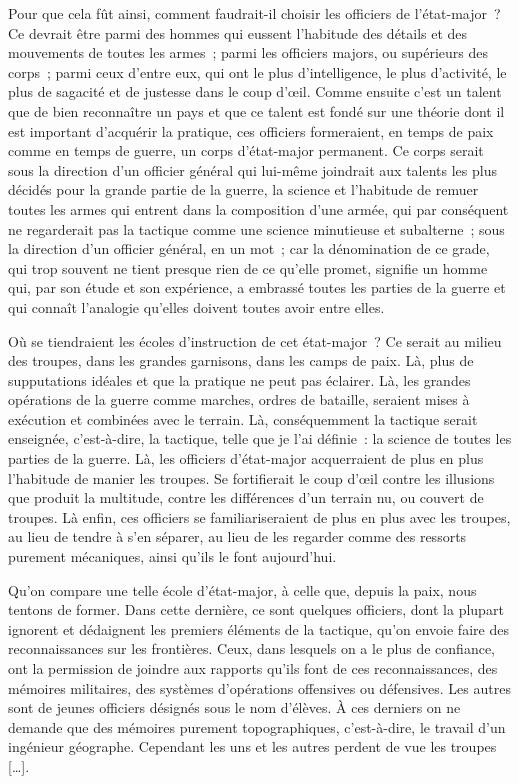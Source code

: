 \documentclass[french,twoside]{book} %
\begin{document}
Pour que cela fût ainsi, comment faudrait-il choisir les officiers de l’état-major ? Ce devrait être parmi des hommes qui eussent l’habitude des détails et des mouvements de toutes les armes ; parmi les officiers majors, ou supérieurs des corps ; parmi ceux d’entre eux, qui ont le plus d’intelligence, le plus d’activité, le plus de sagacité et de justesse dans le coup d’œil. Comme ensuite c’est un talent que de bien reconnaître un pays et que ce talent est fondé sur une théorie dont il est important d’acquérir la pratique, ces officiers formeraient, en temps de paix comme en temps de guerre, un corps d’état-major permanent. Ce corps serait sous la direction d’un officier général qui lui-même joindrait aux talents les plus décidés pour la grande partie de la guerre, la science et l’habitude de remuer toutes les armes qui entrent dans la composition d’une armée, qui par conséquent ne regarderait pas la tactique comme une science minutieuse et subalterne ; sous la direction d’un officier général, en un mot ; car la dénomination de ce grade, qui trop souvent ne tient presque rien de ce qu’elle promet, signifie un homme qui, par son étude et son expérience, a embrassé toutes les parties de la guerre et qui connaît l’analogie qu’elles doivent toutes avoir entre elles.\par
Où se tiendraient les écoles d’instruction de cet état-major ? Ce serait au milieu des troupes, dans les grandes garnisons, dans les camps de paix. Là, plus de supputations idéales et que la pratique ne peut pas éclairer. Là, les grandes opérations de la guerre comme marches, ordres de bataille, seraient mises à exécution et combinées avec le terrain. Là, conséquemment la tactique serait enseignée, c’est-à-dire, la tactique, telle que je l’ai définie : la science de toutes les parties de la guerre. Là, les officiers d’état-major acquerraient de plus en plus l’habitude de manier les troupes. Se fortifierait le coup d’œil contre les illusions que produit la multitude, contre les différences d’un terrain nu, ou couvert de troupes. Là enfin, ces officiers se familiariseraient de plus en plus avec les troupes, au lieu de tendre à s’en séparer, au lieu de les regarder comme des ressorts purement mécaniques, ainsi qu’ils le font aujourd’hui.\par
Qu’on compare une telle école d’état-major, à celle que, depuis la paix, nous tentons de former. Dans cette dernière, ce sont quelques officiers, dont la plupart ignorent et dédaignent les premiers éléments de la tactique, qu’on envoie faire des reconnaissances sur les frontières. Ceux, dans lesquels on a le plus de confiance, ont la permission de joindre aux rapports qu’ils font de ces reconnaissances, des mémoires militaires, des systèmes d’opérations offensives ou défensives. Les autres sont de jeunes officiers désignés sous le nom d’élèves. À ces derniers on ne demande que des mémoires purement topographiques, c’est-à-dire, le travail d’un ingénieur géographe. Cependant les uns et les autres perdent de vue les troupes […].\par
\end{document}
